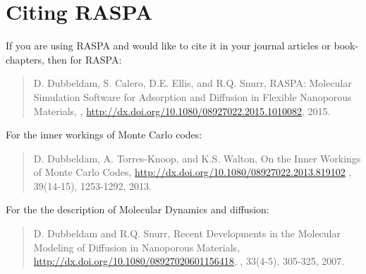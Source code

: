 \section{Citing RASPA}

If you are using RASPA and would like to cite it in your journal articles or book-chapters, then for RASPA:

\begin{quote}
D. Dubbeldam, S. Calero, D.E. Ellis, and R.Q. Snurr,
\newblock RASPA: Molecular Simulation Software for Adsorption and Diffusion in Flexible Nanoporous Materials,
, \url{http://dx.doi.org/10.1080/08927022.2015.1010082}, 2015.
\end{quote}
For the inner workings of Monte Carlo codes:
\begin{quote}
D. Dubbeldam, A. Torres-Knoop, and K.S. Walton,
\newblock On the Inner Workings of Monte Carlo Codes,
\newblock  \url{http://dx.doi.org/10.1080/08927022.2013.819102}
, 39(14-15), 1253-1292, 2013.
\end{quote}
For the the description of Molecular Dynamics and diffusion:
\begin{quote}
D. Dubbeldam and R.Q. Snurr,
\newblock Recent Developments in the Molecular Modeling of Diffusion in Nanoporous Materials,
\newblock  \url{http://dx.doi.org/10.1080/08927020601156418},
, 33(4-5), 305-325, 2007.
\end{quote}

